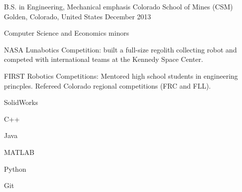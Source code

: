 

\begin{cventries}

  \cventry
    {B.S. in Engineering, Mechanical emphasis} %
    {Colorado School of Mines (CSM)} %
    {Golden, Colorado, United States} %
    {December 2013} %
    {
      \begin{cvitems} %
        \item{Computer Science and Economics minors}
        \item{NASA Lunabotics Competition: built a full-size regolith collecting robot and competed with international teams at the Kennedy Space Center.}
        \item{FIRST Robotics Competitions: Mentored high school students in engineering princples. Refereed Colorado regional competitions (FRC and FLL).}
      \end{cvitems}
    }
    \begin{cventryskills}
      \item SolidWorks
      \item C++
      \item Java
      \item MATLAB
      \item Python
      \item Git
    \end{cventryskills}

\end{cventries}
